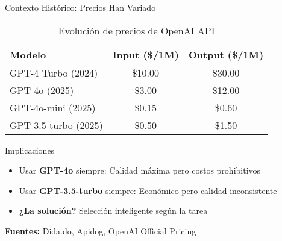\documentclass[aspectratio=169,11pt]{beamer}
\begin{document}
\begin{frame}{Contexto Histórico: Precios Han Variado}
\begin{table}[h]
\centering
\small
\begin{tabular}{|l|c|c|}
\hline
\textbf{Modelo} & \textbf{Input (\$/1M)} & \textbf{Output (\$/1M)} \\ \hline
GPT-4 Turbo (2024) & \$10.00 & \$30.00 \\ \hline
GPT-4o (2025) & \$3.00 & \$12.00 \\ \hline
GPT-4o-mini (2025) & \$0.15 & \$0.60 \\ \hline
GPT-3.5-turbo (2025) & \$0.50 & \$1.50 \\ \hline
\end{tabular}
\caption{Evolución de precios de OpenAI API}
\end{table}

\vspace{0.2cm}

\begin{block}{Implicaciones}
\begin{itemize}
    \item Usar \textbf{GPT-4o} siempre: Calidad máxima pero \textcolor{kavakred}{costos prohibitivos}
    \item Usar \textbf{GPT-3.5-turbo} siempre: Económico pero \textcolor{kavakorange}{calidad inconsistente}
    \item \textbf{¿La solución?} Selección inteligente según la tarea
\end{itemize}
\end{block}

\vspace{0.2cm}
\footnotesize
\textbf{Fuentes:} Dida.do, Apidog, OpenAI Official Pricing
\end{frame}
\end{document}
